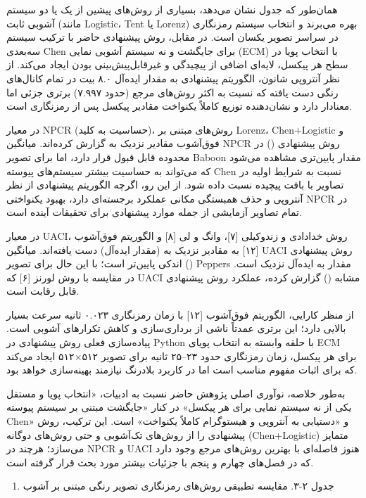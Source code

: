 همان‌طور که جدول نشان می‌دهد، بسیاری از روش‌های پیشین از یک یا دو سیستم آشوبی ثابت (مانند Logistic، Tent یا Lorenz) بهره می‌برند و انتخاب سیستم رمزنگاری در سراسر تصویر یکسان است. در مقابل، روش پیشنهادی حاضر با ترکیب سیستم سه‌بعدی Chen برای جایگشت و نه سیستم آشوبی نمایی (ECM) با انتخاب پویا در سطح هر پیکسل، لایه‌ای اضافی از پیچیدگی و غیرقابل‌پیش‌بینی بودن ایجاد می‌کند. از نظر آنتروپی شانون، الگوریتم پیشنهادی به مقدار ایده‌آل ۸.۰ بیت در تمام کانال‌های رنگی دست یافته که نسبت به اکثر روش‌های مرجع (حدود ۷.۹۹۷) برتری جزئی اما معنادار دارد و نشان‌دهنده توزیع کاملاً یکنواخت مقادیر پیکسل پس از رمزنگاری است.

در معیار NPCR (حساسیت به کلید)، روش‌های مبتنی بر Lorenz، Chen+Logistic و فوق‌آشوب مقادیر نزدیک به  گزارش کرده‌اند. میانگین NPCR روش پیشنهادی () در محدوده قابل قبول قرار دارد، اما برای تصویر Baboon مقدار پایین‌تری مشاهده می‌شود که می‌تواند به حساسیت بیشتر سیستم‌های پیوسته Chen نسبت به شرایط اولیه در تصاویر با بافت پیچیده نسبت داده شود. از این رو، اگرچه الگوریتم پیشنهادی از نظر آنتروپی و حذف همبستگی مکانی عملکرد برجسته‌ای دارد، بهبود یکنواختی NPCR در تمام تصاویر آزمایشی از جمله موارد پیشنهادی برای تحقیقات آینده است.

در معیار UACI، روش خدادادی و زندوکیلی {[}۷{]}، وانگ و لی {[}۸{]} و الگوریتم فوق‌آشوب {[}۱۲{]} به مقادیر نزدیک به  (مقدار ایده‌آل) دست یافته‌اند. میانگین UACI روش پیشنهادی () اندکی پایین‌تر است؛ با این حال برای تصویر Peppers مقدار  به ایده‌آل نزدیک است. در مقایسه با روش لورنز {[}۶{]} که UACI مشابه () گزارش کرده، عملکرد روش پیشنهادی قابل رقابت است.

از منظر کارایی، الگوریتم فوق‌آشوب {[}۱۲{]} با زمان رمزنگاری ۰.۰۲۳ ثانیه سرعت بسیار بالایی دارد؛ این برتری عمدتاً ناشی از برداری‌سازی و کاهش تکرارهای آشوبی است. پیاده‌سازی فعلی روش پیشنهادی در Python با حلقه وابسته به انتخاب پویای ECM برای هر پیکسل، زمان رمزنگاری حدود ۲۳--۲۵ ثانیه برای تصویر ۵۱۲×۵۱۲ ایجاد می‌کند که برای اثبات مفهوم مناسب است اما در کاربرد بلادرنگ نیازمند بهینه‌سازی خواهد بود.

به‌طور خلاصه، نوآوری اصلی پژوهش حاضر نسبت به ادبیات، «انتخاب پویا و مستقل یکی از نه سیستم نمایی برای هر پیکسل» در کنار «جایگشت مبتنی بر سیستم پیوسته Chen» و «دستیابی به آنتروپی و هیستوگرام کاملاً یکنواخت» است. این ترکیب، روش پیشنهادی را از روش‌های تک‌آشوبی و حتی روش‌های دوگانه (Chen+Logistic) متمایز می‌سازد؛ هرچند در NPCR و UACI هنوز فاصله‌ای با بهترین روش‌های مرجع وجود دارد که در فصل‌های چهارم و پنجم با جزئیات بیشتر مورد بحث قرار گرفته است.

\begin{enumerate}
\def\labelenumi{\arabic{enumi}.}
\item
  جدول ۲-۳. مقایسه تطبیقی روش‌های رمزنگاری تصویر رنگی مبتنی بر آشوب
\end{enumerate}

